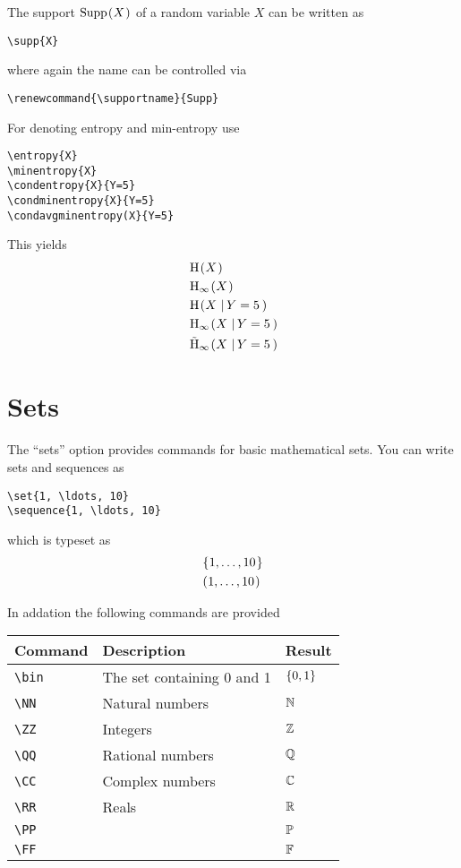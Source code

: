 \documentclass[a4paper]{report}
\begin{document}
The support $\supp{X}$ of a random variable $X$ can be written as
\begin{lstlisting}
\supp{X}
\end{lstlisting}
where again the name can be controlled via
\begin{lstlisting}
\renewcommand{\supportname}{Supp}
\end{lstlisting}

For denoting entropy and min-entropy use
\begin{lstlisting}
\entropy{X}
\minentropy{X}
\condentropy{X}{Y=5}
\condminentropy{X}{Y=5}
\condavgminentropy(X}{Y=5}
\end{lstlisting}
This yields 
\begin{align*}
& \entropy{X} \\
& \minentropy{X} \\
& \condentropy{X}{Y=5} \\
& \condminentropy{X}{Y=5} \\
& \condavgminentropy{X}{Y=5}
\end{align*}

\section{Sets}
The \enquote{sets} option provides commands for basic mathematical sets.
You can write sets and sequences as
\begin{lstlisting}
\set{1, \ldots, 10}
\sequence{1, \ldots, 10}
\end{lstlisting}
which is typeset as
\begin{align*}
& \set{1, \ldots, 10} \\
& \sequence{1, \ldots, 10}
\end{align*}

In addation the following commands are provided
\begin{center}
\begin{tabular}{l l l}
\textbf{Command} & \textbf{Description} & \textbf{Result} \\\hline
\lstinline$\bin$ & The set containing 0 and 1 & $\{0,1\}$  \\
\lstinline$\NN$ & Natural numbers & $\mathbb{N}$  \\
\lstinline$\ZZ$ & Integers & $\mathbb{Z}$  \\
\lstinline$\QQ$ & Rational numbers & $\mathbb{Q}$  \\
\lstinline$\CC$ & Complex numbers & $\mathbb{C}$  \\
\lstinline$\RR$ & Reals & $\mathbb{R}$  \\
\lstinline$\PP$ & & $\mathbb{P}$  \\
\lstinline$\FF$ & & $\mathbb{F}$  \\
\end{tabular}
\end{center}
\end{document}
